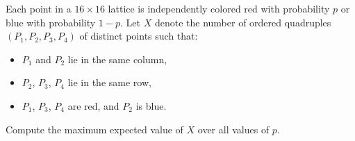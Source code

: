 Each point in a $16\times 16$ lattice is independently colored red with probability $p$ or blue with probability $1-p$. Let $X$ denote the number of ordered quadruples $(P_1,P_2, P_3, P_4)$ of distinct points such that:

\begin{itemize}

\item $P_1$ and $P_2$ lie in the same column,

\item $P_2$, $P_3$, $P_4$ lie in the same row,

\item $P_1$, $P_3$, $P_4$ are red, and $P_2$ is blue.

\end{itemize}

Compute the maximum expected value of $X$ over all values of $p$.
